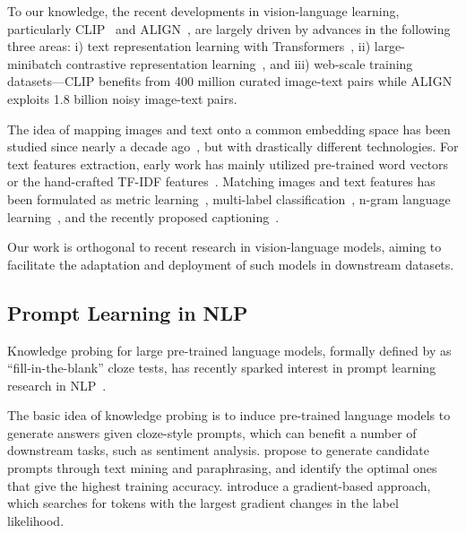To our knowledge, the recent developments in vision-language learning, particularly CLIP~\citep{radford2021learning} and ALIGN~\citep{jia2021scaling}, are largely driven by advances in the following three areas: i) text representation learning with Transformers~\citep{vaswani2017attention}, ii) large-minibatch contrastive representation learning~\citep{chen2020simple,he2020momentum,henaff2020data}, and iii) web-scale training datasets---CLIP benefits from 400 million curated image-text pairs while ALIGN exploits 1.8 billion noisy image-text pairs.

The idea of mapping images and text onto a common embedding space has been studied since nearly a decade ago~\citep{socher2013zero,frome2013devise,elhoseiny2013write}, but with drastically different technologies. For text features extraction, early work has mainly utilized pre-trained word vectors~\citep{socher2013zero,frome2013devise} or the hand-crafted TF-IDF features~\citep{elhoseiny2013write,lei2015predicting}. Matching images and text features has been formulated as metric learning~\citep{frome2013devise}, multi-label classification~\citep{joulin2016learning,gomez2017self}, n-gram language learning~\citep{li2017learning}, and the recently proposed captioning~\citep{desai2021virtex}.

Our work is orthogonal to recent research in vision-language models, aiming to facilitate the adaptation and deployment of such models in downstream datasets.

\subsection{Prompt Learning in NLP} \label{sec:related_work;subsec:prompt_nlp}
Knowledge probing for large pre-trained language models, formally defined by \citet{petroni2019language} as ``fill-in-the-blank'' cloze tests, has recently sparked interest in prompt learning research in NLP~\citep{shin2020autoprompt,jiang2020can,li2021prefix,zhong2021factual,lester2021power,gao2020making,liu2021gpt}.

The basic idea of knowledge probing is to induce pre-trained language models to generate answers given cloze-style prompts, which can benefit a number of downstream tasks, such as sentiment analysis. \citet{jiang2020can} propose to generate candidate prompts through text mining and paraphrasing, and identify the optimal ones that give the highest training accuracy. \citet{shin2020autoprompt} introduce a gradient-based approach, which searches for tokens with the largest gradient changes in the label likelihood.

